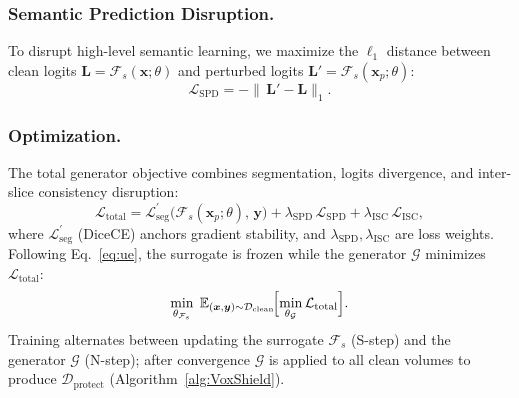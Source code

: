 \documentclass[runningheads]{llncs}
\begin{document}
\subsubsection{Semantic Prediction Disruption.}
To disrupt high-level semantic learning, we maximize the $\ell_1$
distance between clean logits $\bm{L}\!=\!\mathcal{F}_s(\bm{x};\theta)$
and perturbed logits $\bm{L}'\!=\!\mathcal{F}_s(\bm{x}_p;\theta)$:
\begin{equation}
  \mathcal{L}_{\text{SPD}}
  =-\bigl\|\,\bm{L}' - \bm{L}\bigr\|_1.
  \label{eq:sp}
\end{equation}
\subsubsection{Optimization.}
The total generator objective combines segmentation, logits
divergence, and inter-slice consistency disruption:
\begin{equation}
  \mathcal{L}_{\mathrm{total}}
  =\mathcal{L}_{\mathrm{seg}}^{\mathcal{'}}\!\big(\mathcal{F}_s(\bm{x}_p;\theta),\,\bm{y}\big)
  +\lambda_{\text{SPD}}\,\mathcal{L}_{\text{SPD}}
  +\lambda_{\text{ISC}}\,\mathcal{L}_{\text{ISC}},
  \label{eq:total}
\end{equation}
where $\mathcal{L}_{\text{seg}}^{'}$ (DiceCE) anchors gradient stability, and $\lambda_{\text{SPD}},\lambda_{\text{ISC}}$ are loss weights.
Following Eq.~\eqref{eq:ue}, the surrogate is frozen while the
generator $\mathcal{G}$ minimizes $\mathcal{L}_{\mathrm{total}}$:
\begin{equation}
  \min_{\theta_{\mathcal{F}_s}}\;
  \mathbb{E}_{(\bm{x},\bm{y})\sim\mathcal{D}_{\mathrm{clean}}}
  \!\Bigl[\min_{\theta_{\mathcal{G}}}
    \mathcal{L}_{\mathrm{total}}\Bigr].
  \label{eq:bilevel}
\end{equation}
Training alternates between updating the surrogate $\mathcal{F}_s$ (S-step) and the generator $\mathcal{G}$ (N-step); after convergence $\mathcal{G}$ is applied to all clean volumes to produce $\mathcal{D}_{\mathrm{protect}}$ (Algorithm~\ref{alg:VoxShield}).
\end{document}
